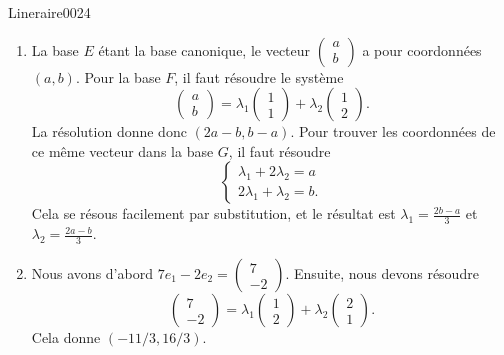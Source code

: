 \begin{corrige}{Lineraire0024}

	\begin{enumerate}
		\item
		La base $E$ étant la base canonique, le vecteur $\begin{pmatrix}
			a	\\ 
			b	
		\end{pmatrix}$ a pour coordonnées $(a,b)$. Pour la base $F$, il faut résoudre le système
		\begin{equation}
			\begin{pmatrix}
				a	\\ 
				b	
			\end{pmatrix}=\lambda_1\begin{pmatrix}
				1	\\ 
				1	
			\end{pmatrix}+\lambda_2\begin{pmatrix}
				1	\\ 
				2	
			\end{pmatrix}.
		\end{equation}
		La résolution donne donc $(2a-b,b-a)$. Pour trouver les coordonnées de ce même vecteur dans la base $G$, il faut résoudre
		\begin{equation}
			\left\{
			\begin{array}{ll}
				\lambda_1+2\lambda_2=a\\
				2\lambda_1+\lambda_2=b.
			\end{array}
			\right.
		\end{equation}
		Cela se résous facilement par substitution, et le résultat est $\lambda_1=\frac{ 2b-a }{ 3 }$ et $\lambda_2=\frac{ 2a-b }{ 3 }$.

	
		\item
			Nous avons d'abord $7e_1-2e_2=\begin{pmatrix}
				7	\\ 
				-2	
			\end{pmatrix}$. Ensuite, nous devons résoudre
			\begin{equation}
				\begin{pmatrix}
					7	\\ 
					-2	
				\end{pmatrix}=\lambda_1\begin{pmatrix}
					1	\\ 
					2	
				\end{pmatrix}+\lambda_2\begin{pmatrix}
					2	\\ 
					1	
				\end{pmatrix}.
			\end{equation}
			Cela donne $(-11/3,16/3)$.

	\end{enumerate}
	
\end{corrige}
